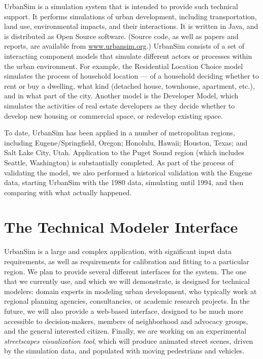 \documentclass[11pt]{article}
\begin{document}
UrbanSim \cite{waddell-sscr-2004,waddell-ulfarsson-2004}
is a simulation system that is intended to provide such technical support.
It performs simulations of urban development, including transportation,
land use, environmental impacts, and their interactions.  It is written in
Java, and is distributed as Open Source software.  (Source code,
as well as papers and reports, are available from
\mbox{\url{www.urbansim.org}}.)  UrbanSim consists of a set of interacting
component models that simulate different actors or processes within the
urban environment.  For example, the Residential Location Choice model
simulates the process of household location --- of a household deciding
whether to rent or buy a dwelling, what kind (detached house, townhouse,
apartment, etc.), and in what part of the city.  Another model is the
Developer Model, which simulates the activities of real estate developers
as they decide whether to develop new housing or commercial space, or
redevelop existing space.

To date, UrbanSim has been applied in a number of metropolitan regions,
including Eugene/Springfield, Oregon; Honolulu, Hawaii; Houston, Texas; and
Salt Lake City, Utah.  Application to the Puget Sound region (which
includes Seattle, Washington) is substantially completed.  As part of the
process of validating the model, we also performed a historical validation
with the Eugene data, starting UrbanSim with the 1980 data, simulating
until 1994, and then comparing with what actually happened.

\section{The Technical Modeler Interface}

UrbanSim is a large and complex application, with significant input data
requirements, as well as requirements for calibration and fitting to a
particular region.  We plan to provide several different interfaces for the
system.  The one that we currently use, and which we will demonstrate, is
designed for technical modelers: domain experts in modeling urban
development, who typically work at regional planning agencies,
consultancies, or academic research projects.  In the future, we will also
provide a web-based interface, designed to be much more accessible to
decision-makers, members of neighborhood and advocacy groups, and the
general interested citizen.  Finally, we are working on an experimental
\emph{streetscapes visualization tool}, which will produce animated street
scenes, driven by the simulation data, and populated with moving
pedestrians and vehicles.  
\end{document}
